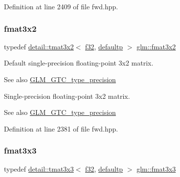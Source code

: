 Definition at line 2409 of file fwd.\+hpp.

\mbox{\label{group__gtc__type__precision_ga723b6e3dd4ff1c0d76d3c9f72ea0d9a7}} 
\subsubsection{\texorpdfstring{fmat3x2}{fmat3x2}}
{\footnotesize\ttfamily typedef \hyperlink{structglm_1_1detail_1_1tmat3x2}{detail\+::tmat3x2}$<$ \hyperlink{group__gtc__type__precision_ga0ec999b57f5330d9021256e96038df04}{f32}, \hyperlink{namespaceglm_a0f04f086094c747d227af4425893f545a9d21ccd8b5a009ec7eb7677befc3bf51}{defaultp} $>$ \hyperlink{group__gtc__type__precision_ga723b6e3dd4ff1c0d76d3c9f72ea0d9a7}{glm\+::fmat3x2}}

Default single-\/precision floating-\/point 3x2 matrix. \begin{DoxySeeAlso}{See also}
\hyperlink{group__gtc__type__precision}{G\+L\+M\+\_\+\+G\+T\+C\+\_\+type\+\_\+precision}
\end{DoxySeeAlso}
Single-\/precision floating-\/point 3x2 matrix. \begin{DoxySeeAlso}{See also}
\hyperlink{group__gtc__type__precision}{G\+L\+M\+\_\+\+G\+T\+C\+\_\+type\+\_\+precision} 
\end{DoxySeeAlso}


Definition at line 2381 of file fwd.\+hpp.

\mbox{\label{group__gtc__type__precision_gafa6841eaaa5ee45de1d892c26b349571}} 
\subsubsection{\texorpdfstring{fmat3x3}{fmat3x3}}
{\footnotesize\ttfamily typedef \hyperlink{structglm_1_1detail_1_1tmat3x3}{detail\+::tmat3x3}$<$ \hyperlink{group__gtc__type__precision_ga0ec999b57f5330d9021256e96038df04}{f32}, \hyperlink{namespaceglm_a0f04f086094c747d227af4425893f545a9d21ccd8b5a009ec7eb7677befc3bf51}{defaultp} $>$ \hyperlink{group__gtc__type__precision_gafa6841eaaa5ee45de1d892c26b349571}{glm\+::fmat3x3}}

